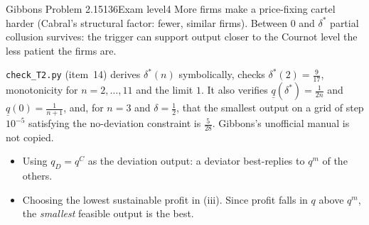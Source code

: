 \begin{exsol}{Gibbons Problem 2.15}{136}{Exam level}{4}
\interp More firms make a price-fixing cartel harder (Cabral's structural factor: fewer, similar firms).
Between $0$ and $\delta^*$ partial collusion survives: the trigger can support output closer to the
Cournot level the less patient the firms are.

\verify \texttt{check\_T2.py} (item~14) derives $\delta^*(n)$ symbolically, checks $\delta^*(2) = \frac9{17}$,
monotonicity for $n = 2,\dots,11$ and the limit $1$. It also verifies $\underline q(\delta^*) = \frac1{2n}$ and
$\underline q(0) = \frac1{n+1}$, and, for $n = 3$ and $\delta = \frac12$, that the smallest output on a grid of
step $10^{-5}$ satisfying the no-deviation constraint is $\frac5{28}$. Gibbons's unofficial manual is not copied.

\mistakes
\begin{itemize}
  \item Using $q_D = q^C$ as the deviation output: a deviator best-replies to $q^m$ of the others.
  \item Choosing the lowest sustainable profit in (iii). Since profit falls in $q$ above $q^m$, the \emph{smallest}
  feasible output is the best.
\end{itemize}

\end{exsol}
